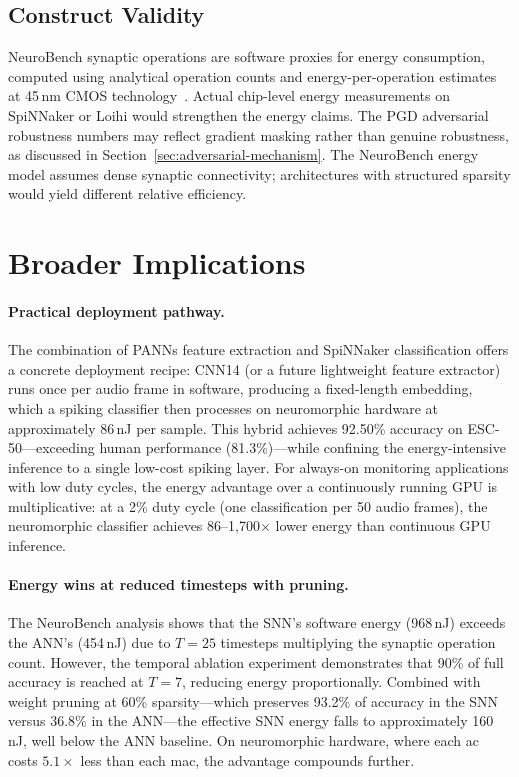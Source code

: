 \subsection{Construct Validity}

NeuroBench synaptic operations are software proxies for energy consumption, computed using analytical operation counts and energy-per-operation estimates at 45\,nm CMOS technology~\citep{horowitz2014energy}. Actual chip-level energy measurements on SpiNNaker or Loihi would strengthen the energy claims. The PGD adversarial robustness numbers may reflect gradient masking rather than genuine robustness, as discussed in Section~\ref{sec:adversarial-mechanism}. The NeuroBench energy model assumes dense synaptic connectivity; architectures with structured sparsity would yield different relative efficiency.

\section{Broader Implications}
\label{sec:broader-implications}

\paragraph{Practical deployment pathway.}
The combination of PANNs feature extraction and SpiNNaker classification offers a concrete deployment recipe: CNN14 (or a future lightweight feature extractor) runs once per audio frame in software, producing a fixed-length embedding, which a spiking classifier then processes on neuromorphic hardware at approximately 86\,nJ per sample. This hybrid achieves 92.50\% accuracy on ESC-50---exceeding human performance (81.3\%)---while confining the energy-intensive inference to a single low-cost spiking layer. For always-on monitoring applications with low duty cycles, the energy advantage over a continuously running GPU is multiplicative: at a 2\% duty cycle (one classification per 50 audio frames), the neuromorphic classifier achieves 86--1,700$\times$ lower energy than continuous GPU inference.

\paragraph{Energy wins at reduced timesteps with pruning.}
The NeuroBench analysis shows that the SNN's software energy (968\,nJ) exceeds the ANN's (454\,nJ) due to $T = 25$ timesteps multiplying the synaptic operation count. However, the temporal ablation experiment demonstrates that 90\% of full accuracy is reached at $T = 7$, reducing energy proportionally. Combined with weight pruning at 60\% sparsity---which preserves 93.2\% of accuracy in the SNN versus 36.8\% in the ANN---the effective SNN energy falls to approximately 160\,nJ, well below the ANN baseline. On neuromorphic hardware, where each \gls{ac} costs $5.1\times$ less than each \gls{mac}, the advantage compounds further.

